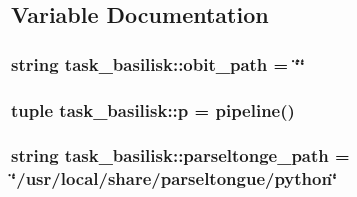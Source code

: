 \subsection{\-Variable \-Documentation}
\hypertarget{namespacetask__basilisk_aed0c6d1cc698b489fcaf1af9b94d8654}{
\subsubsection[{obit\-\_\-path}]{\setlength{\rightskip}{0pt plus 5cm}string {\bf task\-\_\-basilisk\-::obit\-\_\-path} = \char`\"{}\char`\"{}}}\label{namespacetask__basilisk_aed0c6d1cc698b489fcaf1af9b94d8654}
\hypertarget{namespacetask__basilisk_a50730ce96c7f9275aecc19e75bf4a7bf}{
\subsubsection[{p}]{\setlength{\rightskip}{0pt plus 5cm}tuple {\bf task\-\_\-basilisk\-::p} = pipeline()}}\label{namespacetask__basilisk_a50730ce96c7f9275aecc19e75bf4a7bf}
\hypertarget{namespacetask__basilisk_a898b155fdd6a35d9738b02167102d6e0}{
\subsubsection[{parseltonge\-\_\-path}]{\setlength{\rightskip}{0pt plus 5cm}string {\bf task\-\_\-basilisk\-::parseltonge\-\_\-path} = \char`\"{}/usr/local/share/parseltongue/python\char`\"{}}}\label{namespacetask__basilisk_a898b155fdd6a35d9738b02167102d6e0}
